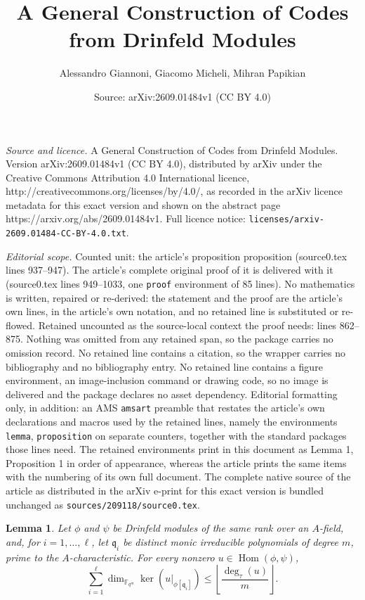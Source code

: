 \documentclass[10pt,a4paper]{amsart}
\title{A General Construction of Codes from Drinfeld Modules}
\author{Alessandro Giannoni, Giacomo Micheli, Mihran Papikian}
\date{Source: arXiv:2609.01484v1 (CC BY 4.0)}
\newtheorem{lemma}{Lemma}
\DeclareMathOperator{\Hom}{Hom}
\newcommand{\vF}{\mathbb F}
\begin{document}
\maketitle

\noindent\emph{Source and licence.} A General Construction of Codes from Drinfeld Modules. Version arXiv:2609.01484v1 (CC BY 4.0), distributed by arXiv under the Creative Commons Attribution 4.0 International licence, http://creativecommons.org/licenses/by/4.0/, as recorded in the arXiv licence metadata for this exact version and shown on the abstract page https://arxiv.org/abs/2609.01484v1. Full licence notice: \texttt{licenses/arxiv-2609.01484-CC-BY-4.0.txt}.\par\smallskip

\noindent\textit{Editorial scope.} Counted unit: the article's proposition proposition (source0.tex lines 937--947). The article's complete original proof of it is delivered with it (source0.tex lines 949--1033, one \texttt{proof} environment of 85 lines). No mathematics is written, repaired or re-derived: the statement and the proof are the article's own lines, in the article's own notation, and no retained line is substituted or re-flowed.  Retained uncounted as the source-local context the proof needs: lines 862--875.  Nothing was omitted from any retained span, so the package carries no omission record.  No retained line contains a citation, so the wrapper carries no bibliography and no bibliography entry.  No retained line contains a figure environment, an image-inclusion command or drawing code, so no image is delivered and the package declares no asset dependency.  Editorial formatting only, in addition: an AMS \texttt{amsart} preamble that restates the article's own declarations and macros used by the retained lines, namely the environments \texttt{lemma}, \texttt{proposition} on separate counters, together with the standard packages those lines need.  The retained environments print in this document as Lemma 1, Proposition 1 in order of appearance, whereas the article prints the same items with the numbering of its own full document.  The complete native source of the article as distributed in the arXiv e-print for this exact version is bundled unchanged as \texttt{sources/209118/source0.tex}.
\begin{lemma}
\label{lem:torsion-root-count}
Let $\phi$ and $\psi$ be Drinfeld modules of the same rank over an $A$-field,
and, for $i=1,\ldots,\ell$, let $\mathfrak q_i$ be distinct monic
irreducible polynomials of degree $m$, prime to the $A$-characteristic. For
every nonzero $u\in\Hom(\phi,\psi)$,
$$
\sum_{i=1}^{\ell}
\dim_{\vF_{q^m}}
\ker\left(u|_{\phi[\mathfrak q_i]}\right)
\leq
\left\lfloor\frac{\deg_\tau(u)}{m}\right\rfloor.
$$
\end{lemma}
\end{document}
